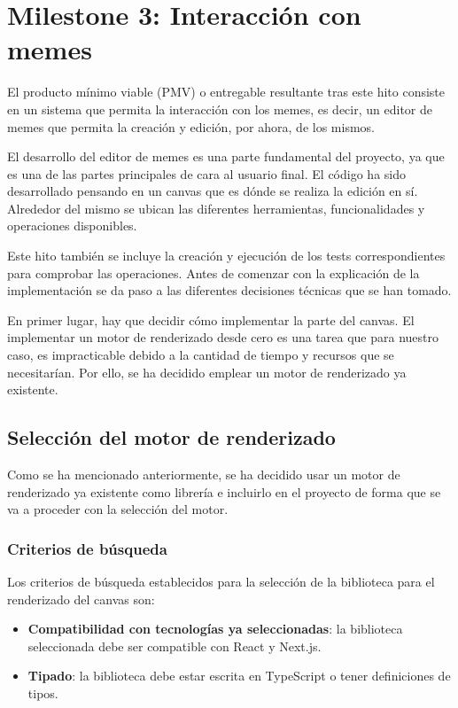 \section{Milestone 3: Interacción con memes}

El producto mínimo viable (PMV) o entregable resultante tras este hito consiste en un sistema que permita la interacción con los memes, es decir, un editor de memes que permita la creación y edición, por ahora, de los mismos.

El desarrollo del editor de memes es una parte fundamental del proyecto, ya que es una de las partes principales de cara al usuario final. El código ha sido desarrollado pensando en un canvas que es dónde se realiza la edición en sí. Alrededor del mismo se ubican las diferentes herramientas, funcionalidades y operaciones disponibles.

Este hito también se incluye la creación y ejecución de los tests correspondientes para comprobar las operaciones. Antes de comenzar con la explicación de la implementación se da paso a las diferentes decisiones técnicas que se han tomado.

En primer lugar, hay que decidir cómo implementar la parte del canvas. El implementar un motor de renderizado desde cero es una tarea que para nuestro caso, es impracticable debido a la cantidad de tiempo y recursos que se necesitarían. Por ello, se ha decidido emplear un motor de renderizado ya existente.

\subsection{Selección del motor de renderizado}

Como se ha mencionado anteriormente, se ha decidido usar un motor de renderizado ya existente como librería e incluirlo en el proyecto de forma que se va a proceder con la selección del motor.

\subsubsection{Criterios de búsqueda}

Los criterios de búsqueda establecidos para la selección de la biblioteca para el renderizado del canvas son:

\begin{itemize}
  \item \textbf{Compatibilidad con tecnologías ya seleccionadas}: la biblioteca seleccionada debe ser compatible con React y Next.js.
  \item \textbf{Tipado}: la biblioteca debe estar escrita en TypeScript o tener definiciones de tipos.
\end{itemize}

